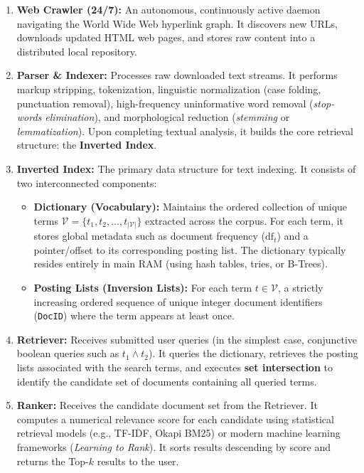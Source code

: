 \begin{enumerate}
  \item \textbf{Web Crawler (24/7):} An autonomous, continuously active daemon navigating the World Wide Web hyperlink graph. It discovers new URLs, downloads updated HTML web pages, and stores raw content into a distributed local repository.
  \item \textbf{Parser \& Indexer:} Processes raw downloaded text streams. It performs markup stripping, tokenization, linguistic normalization (case folding, punctuation removal), high-frequency uninformative word removal (\textit{stop-words elimination}), and morphological reduction (\textit{stemming} or \textit{lemmatization}). Upon completing textual analysis, it builds the core retrieval structure: the \textbf{Inverted Index}.
  \item \textbf{Inverted Index:} The primary data structure for text indexing. It consists of two interconnected components:
  \begin{itemize}
    \item \textbf{Dictionary (Vocabulary):} Maintains the ordered collection of unique terms $\mathcal{V} = \{t_1, t_2, \dots, t_{|\mathcal{V}|}\}$ extracted across the corpus. For each term, it stores global metadata such as document frequency ($\text{df}_t$) and a pointer/offset to its corresponding posting list. The dictionary typically resides entirely in main RAM (using hash tables, tries, or B-Trees).
    \item \textbf{Posting Lists (Inversion Lists):} For each term $t \in \mathcal{V}$, a strictly increasing ordered sequence of unique integer document identifiers (\texttt{DocID}) where the term appears at least once.
  \end{itemize}
  \item \textbf{Retriever:} Receives submitted user queries (in the simplest case, conjunctive boolean queries such as $t_1 \land t_2$). It queries the dictionary, retrieves the posting lists associated with the search terms, and executes \textbf{set intersection} to identify the candidate set of documents containing all queried terms.
  \item \textbf{Ranker:} Receives the candidate document set from the Retriever. It computes a numerical relevance score for each candidate using statistical retrieval models (e.g., TF-IDF, Okapi BM25) or modern machine learning frameworks (\textit{Learning to Rank}). It sorts results descending by score and returns the Top-$k$ results to the user.
\end{enumerate}

